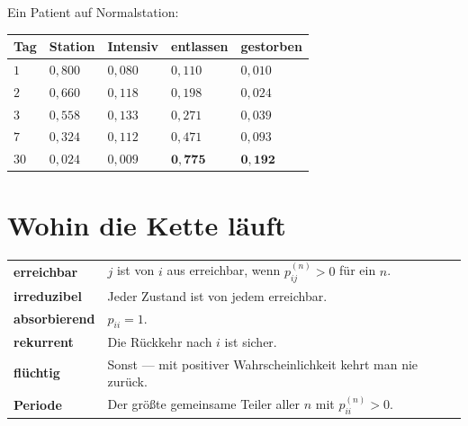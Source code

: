 \begin{merksatz}
Ein Patient auf Normalstation:

\begin{center}
{\small
\renewcommand{\arraystretch}{1.48}
\begin{tabular}{@{}P{1.4cm}P{1.8cm}P{1.8cm}P{1.8cm}P{1.8cm}@{}}
\toprule
\textbf{Tag} & \textbf{Station} & \textbf{Intensiv} & \textbf{entlassen} & \textbf{gestorben}\\
\midrule
$1$ & $0{,}800$ & $0{,}080$ & $0{,}110$ & $0{,}010$\\
$2$ & $0{,}660$ & $0{,}118$ & $0{,}198$ & $0{,}024$\\
$3$ & $0{,}558$ & $0{,}133$ & $0{,}271$ & $0{,}039$\\
$7$ & $0{,}324$ & $0{,}112$ & $0{,}471$ & $0{,}093$\\
$30$ & $0{,}024$ & $0{,}009$ & $\mathbf{0{,}775}$ & $\mathbf{0{,}192}$\\
\bottomrule
\end{tabular}}
\end{center}

\begin{center}
\begin{minipage}{0.88\textwidth}
\end{minipage}
\end{center}
\end{merksatz}

\section{Wohin die Kette läuft}

\begin{definition}
\begin{center}
{\small
\renewcommand{\arraystretch}{1.55}
\begin{tabular}{@{}P{2.6cm}P{6.0cm}@{}}
\toprule
\textbf{erreichbar} & $j$ ist von $i$ aus erreichbar, wenn $p^{(n)}_{ij} > 0$ für ein $n$.\\
\textbf{irreduzibel} & Jeder Zustand ist von jedem erreichbar.\\
\textbf{absorbierend} & $p_{ii} = 1$.\\
\textbf{rekurrent} & Die Rückkehr nach $i$ ist sicher.\\
\textbf{flüchtig} & Sonst --- mit positiver Wahrscheinlichkeit kehrt man nie zurück.\\
\textbf{Periode} & Der größte gemeinsame Teiler aller $n$ mit $p^{(n)}_{ii} > 0$.\\
\bottomrule
\end{tabular}}
\end{center}
\end{definition}


